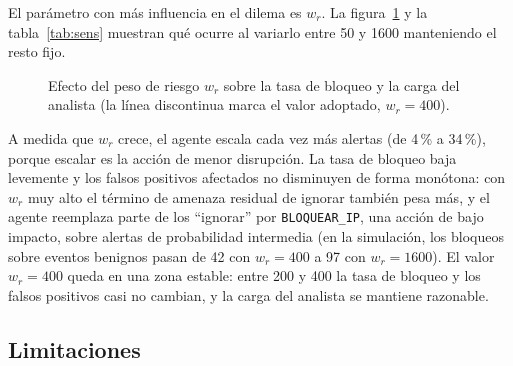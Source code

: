 \documentclass[11pt,a4paper]{article}
\begin{document}
El parámetro con más influencia en el dilema es $w_r$. La figura~\ref{fig:sens} y la tabla~\ref{tab:sens} muestran qué ocurre al variarlo entre 50 y 1600 manteniendo el resto fijo.

\begin{figure}[H]
\centering
{}
\caption{Efecto del peso de riesgo $w_r$ sobre la tasa de bloqueo y la carga del analista (la línea discontinua marca el valor adoptado, $w_r=400$).}\label{fig:sens}
\end{figure}

\begin{table}[H]
\centering
\caption{Sensibilidad de los KPIs al peso de riesgo $w_r$.}\label{tab:sens}
\small

\end{table}

A medida que $w_r$ crece, el agente escala cada vez más alertas (de 4\,\% a 34\,\%), porque escalar es la acción de menor disrupción. La tasa de bloqueo baja levemente y los falsos positivos afectados no disminuyen de forma monótona: con $w_r$ muy alto el término de amenaza residual de ignorar también pesa más, y el agente reemplaza parte de los ``ignorar'' por \texttt{BLOQUEAR\_IP}, una acción de bajo impacto, sobre alertas de probabilidad intermedia (en la simulación, los bloqueos sobre eventos benignos pasan de 42 con $w_r=400$ a 97 con $w_r=1600$). El valor $w_r=400$ queda en una zona estable: entre 200 y 400 la tasa de bloqueo y los falsos positivos casi no cambian, y la carga del analista se mantiene razonable.

\subsection{Limitaciones}
\end{document}
